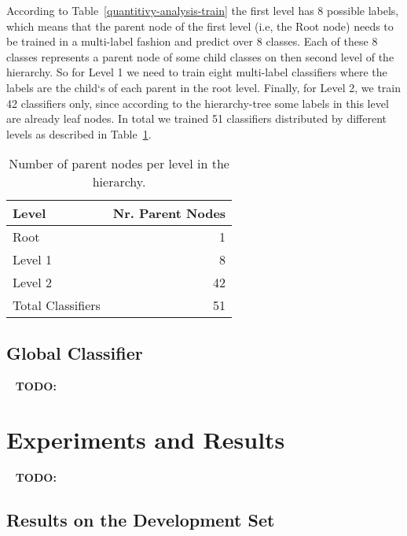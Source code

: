 \documentclass[11pt,a4paper]{article}
\begin{document}
According to Table~\ref{quantitivy-analysis-train} the first level has 8 possible
labels, which means that the parent node of the first level (i.e, the Root node)
needs to be trained in a multi-label fashion and predict over 8 classes. Each of
these 8 classes represents a parent node of some child classes on then
second level of the hierarchy. So for Level 1 we need to train eight multi-label
classifiers where the labels are the child`s of each parent in the root level.
Finally, for Level 2, we train 42 classifiers only, since according to the
hierarchy-tree some labels in this level are already leaf nodes. In total we
trained 51 classifiers distributed by different levels as described in
Table~\ref{parent-per-node-classifiers}.

\begin{table}[!h]
\begin{center}
\begin{tabular}{|l|r|}
\hline\centering\textbf{Level}  &  \textbf{Nr. Parent Nodes}    \\
\hline
Root              &  1       \\
Level 1           &  8       \\
Level 2           &  42      \\
\hline
Total Classifiers & 51       \\
\hline
\end{tabular}
\end{center}
\caption{\label{parent-per-node-classifiers}Number of parent nodes per level in the hierarchy.}
\end{table}

\subsection{Global Classifier}

\ \newline
\textbf{TODO:}
\ \newline


\section{Experiments and Results}\label{experiments}

\ \newline
\textbf{TODO:}
\ \newline

\subsection{Results on the Development Set}
\end{document}
